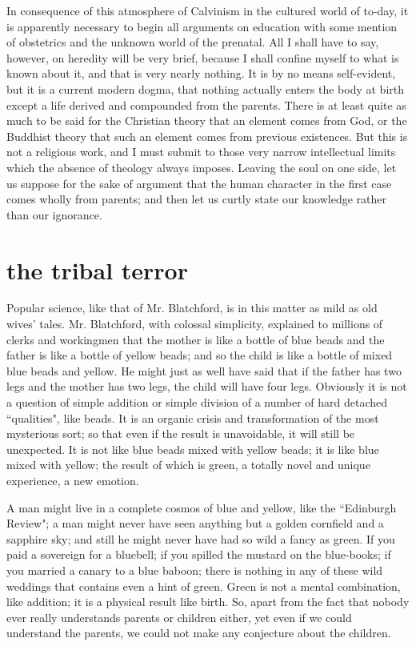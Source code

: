 \documentclass[final,10pt,letterpaper,twocolumn,openany]{book}
\begin{document}
In consequence of this atmosphere of Calvinism in the cultured world
of to-day, it is apparently necessary to begin all arguments on education
with some mention of obstetrics and the unknown world of the prenatal.
All I shall have to say, however, on heredity will be very brief, because I
shall confine myself to what is known about it, and that is very nearly
nothing. It is by no means self-evident, but it is a current modern dogma,
that nothing actually enters the body at birth except a life derived and
compounded from the parents. There is at least quite as much to be said
for the Christian theory that an element comes from God, or the Buddhist
theory that such an element comes from previous existences. But this is
not a religious work, and I must submit to those very narrow intellectual
limits which the absence of theology always imposes. Leaving the soul on
one side, let us suppose for the sake of argument that the human character
in the first case comes wholly from parents; and then let us curtly state our
knowledge rather than our ignorance.

\section{the tribal terror}

     Popular science, like that of Mr. Blatchford, is in this matter as mild as
old wives' tales. Mr. Blatchford, with colossal simplicity, explained to
millions of clerks and workingmen that the mother is like a bottle of blue
beads and the father is like a bottle of yellow beads; and so the child is like
a bottle of mixed blue beads and yellow. He might just as well have said
that if the father has two legs and the mother has two legs, the child will
have four legs. Obviously it is not a question of simple addition or simple
division of a number of hard detached ``qualities", like beads. It is an
organic crisis and transformation of the most mysterious sort; so that even
if the result is unavoidable, it will still be unexpected. It is not like blue
beads mixed with yellow beads; it is like blue mixed with yellow; the
result of which is green, a totally novel and unique experience, a new
emotion. 

A man might live in a complete cosmos of blue and yellow, like
the ``Edinburgh Review"; a man might never have seen anything but a
golden cornfield and a sapphire sky; and still he might never have had so
wild a fancy as green. If you paid a sovereign for a bluebell; if you spilled
the mustard on the blue-books; if you married a canary to a blue baboon;
there is nothing in any of these wild weddings that contains even a hint of
green. Green is not a mental combination, like addition; it is a physical
result like birth. So, apart from the fact that nobody ever really
understands parents or children either, yet even if we could understand the
parents, we could not make any conjecture about the children. 
\end{document}
